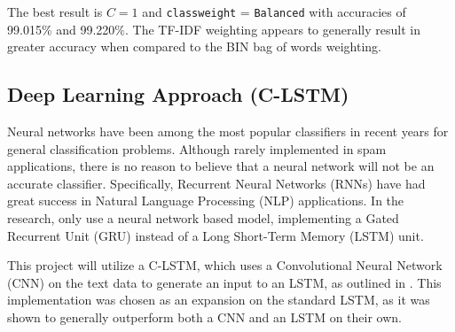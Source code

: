 \documentclass [12 pt] {report}
\begin{document}
\begin{table}[H]
\small
{}
\label{table:SVM Hyperparameters: TF-IDF}
\end{table}
\FloatBarrier

The best result is $C = 1$ and \texttt{class\textunderscore weight} = \texttt{Balanced} with accuracies of 99.015\% and 99.220\%. The TF-IDF weighting appears to generally result in greater accuracy when compared to the BIN bag of words weighting.


\subsection{Deep Learning Approach (C-LSTM)}
Neural networks have been among the most popular classifiers in recent years for general classification problems. Although rarely implemented in spam applications, there is no reason to believe that a neural network will not be an accurate classifier. Specifically, Recurrent Neural Networks (RNNs) have had great success in Natural Language Processing (NLP) applications. In the research, only \cite{Yang} use a neural network based model, implementing a Gated Recurrent Unit (GRU) instead of a Long Short-Term Memory (LSTM) unit.

This project will utilize a C-LSTM, which uses a Convolutional Neural Network (CNN) on the text data to generate an input to an LSTM, as outlined in \cite{C-LSTM}. This implementation was chosen as an expansion on the standard LSTM, as it was shown to generally outperform both a CNN and an LSTM on their own.
\end{document}

